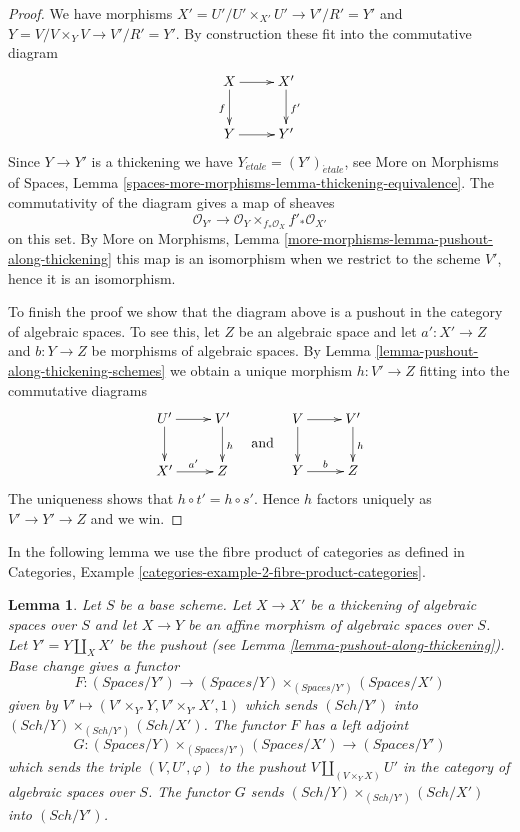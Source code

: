 \documentclass{stacks-project}
\theoremstyle{plain}
\newtheorem{lemma}[subsection]{Lemma}
\theoremstyle{definition}
\theoremstyle{remark}
\numberwithin{equation}{subsection}
\def\Sch{\mathit{Sch}}
\def\etale{{\acute{e}tale}}
\begin{document}
\begin{proof}
\medskip\noindent
We have morphisms $X' = U'/U' \times_{X'} U' \to V'/R' = Y'$ and
$Y = V/V \times_Y V \to V'/R' = Y'$.
By construction these fit into the commutative diagram
$$
\xymatrix{
X \ar[r] \ar[d]_f & X' \ar[d]^{f'} \\
Y \ar[r] & Y'
}
$$
Since $Y \to Y'$ is a thickening we have
$Y_\etale = (Y')_\etale$, see More on Morphisms of Spaces,
Lemma \ref{spaces-more-morphisms-lemma-thickening-equivalence}.
The commutativity of the diagram gives a map of sheaves
$$
\mathcal{O}_{Y'}
\longrightarrow
\mathcal{O}_Y \times_{f_*\mathcal{O}_X} f'_*\mathcal{O}_{X'}
$$
on this set. By More on Morphisms, Lemma
\ref{more-morphisms-lemma-pushout-along-thickening}
this map is an isomorphism when we restrict to
the scheme $V'$, hence it is an isomorphism.

\medskip\noindent
To finish the proof we show that the diagram above is a pushout in
the category of algebraic spaces. To see this, let $Z$ be an algebraic
space and let $a' : X' \to Z$ and $b : Y \to Z$ be morphisms of
algebraic spaces. By
Lemma \ref{lemma-pushout-along-thickening-schemes}
we obtain a unique morphism $h : V' \to Z$ fitting into the commutative
diagrams
$$
\vcenter{
\xymatrix{
U' \ar[d] \ar[r] & V' \ar[d]^h \\
X' \ar[r]^{a'} & Z
}
}
\quad\text{and}\quad
\vcenter{
\xymatrix{
V \ar[r] \ar[d] & V' \ar[d]^h \\
Y \ar[r]^b & Z
}
}
$$
The uniqueness shows that $h \circ t' = h \circ s'$. Hence $h$ factors
uniquely as $V' \to Y' \to Z$ and we win.
\end{proof}

\noindent
In the following lemma we use the fibre product of categories as
defined in
Categories, Example \ref{categories-example-2-fibre-product-categories}.

\begin{lemma}
\label{lemma-categories-spaces-over-pushout}
Let $S$ be a base scheme. Let $X \to X'$ be a thickening of algebraic spaces
over $S$ and let $X \to Y$ be an affine morphism of algebraic spaces over $S$.
Let $Y' = Y \amalg_X X'$ be the pushout (see
Lemma \ref{lemma-pushout-along-thickening}). Base change gives a functor
$$
F :
(\textit{Spaces}/Y')
\longrightarrow
(\textit{Spaces}/Y) \times_{(\textit{Spaces}/Y')} (\textit{Spaces}/X')
$$
given by $V' \longmapsto (V' \times_{Y'} Y, V' \times_{Y'} X', 1)$ which
sends $(\Sch/Y')$ into $(\Sch/Y) \times_{(\Sch/Y')} (\Sch/X')$.
The functor $F$ has a left adjoint
$$
G :
(\textit{Spaces}/Y) \times_{(\textit{Spaces}/Y')} (\textit{Spaces}/X')
\longrightarrow
(\textit{Spaces}/Y')
$$
which sends the triple $(V, U', \varphi)$ to the pushout
$V \amalg_{(V \times_Y X)} U'$ in the category of algebraic spaces over $S$.
The functor $G$ sends $(\Sch/Y) \times_{(\Sch/Y')} (\Sch/X')$ into $(\Sch/Y')$.
\end{lemma}
\end{document}
